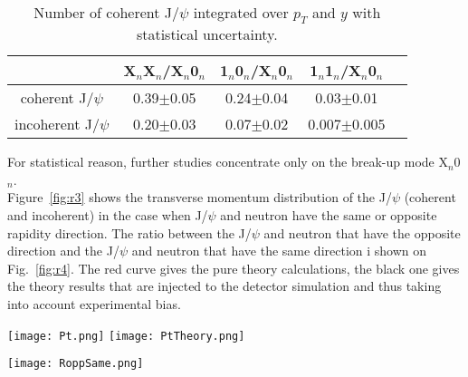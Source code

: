     \begin{table}[h]
      \begin{center}
        \caption{Number of coherent J/$\psi$ integrated over $p_{T}$ and $y$ 
          with statistical uncertainty.}
        \label{tab:r2}
        \begin{tabular}{|c|c|c|c|c|}
          \hline
          & X$_{n}$X$_{n}$/X$_{n}$0$_{n}$ & 1$_{n}$0$_{n}$/X$_{n}$0$_{n}$ & 1$_{n}$1$_{n}$/X$_{n}$0$_{n}$  \\ 
          \hline
          coherent J/$\psi$ &  0.39$\pm$0.05&0.24$\pm$0.04&0.03$\pm$0.01\\
          \hline
          incoherent J/$\psi$ &  0.20$\pm$0.03&0.07$\pm$0.02&0.007$\pm$0.005 \\
          \hline
        \end{tabular}
      \end{center}
    \end{table}

   
    For statistical reason, further studies concentrate only on the break-up mode 
      X$_{n}$0$_{n}$. \\
    Figure~\ref{fig:r3} shows the transverse momentum distribution of the J/$\psi$ 
      (coherent and incoherent) in the case when J/$\psi$ and neutron have the same
      or opposite rapidity direction. 
    The ratio between the J/$\psi$ and neutron that have the opposite direction and
      the J/$\psi$ and neutron that have the same direction i shown on 
      Fig.~\ref{fig:r4}. 
    The red curve gives the pure theory calculations, the black one gives the theory 
      results that are injected to the detector simulation and thus taking into 
      account experimental bias. 
     
    \begin{figure*}[!Hhtb]
      \begin{center}
        \texttt{[image: Pt.png]}
            \texttt{[image: PtTheory.png]}
                 \caption{
        \label{fig:r3}  
         Transverse momentum distribution of the J/$\psi$ when J/$\psi$ and neutron have the same or opposite rapidity direction from data (left) and from theory (right). 
            }
           \end{center}
    \end{figure*}
  
    \begin{figure*}[!Hhtb]
      \begin{center}
        \texttt{[image: RoppSame.png]}\\
                 \caption{
        \label{fig:r4}  
         Ratio between the transverse momentum distribution of the J/$\psi$ when  J/$\psi$ and neutron have the opposite direction and the transverse momentum distribution of the J/$\psi$ when  J/$\psi$ and neutron have the same direction. 
            }
           \end{center}
    \end{figure*}
    
